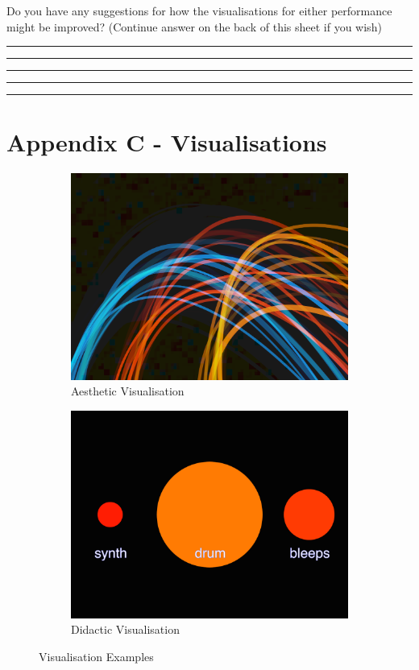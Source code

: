 \documentclass[12pt]{article}
\begin{document}
Do you have any suggestions for how the visualisations for either performance might be improved? (Continue answer on the back of this sheet if you wish)\\

\hrule \bigskip \hrule \bigskip \hrule \bigskip \hrule \bigskip \hrule \bigskip

\newpage
\section*{Appendix C - Visualisations}

\begin{figure}[H]
\centering
\begin{subfigure}{.5\textwidth}
    \centering
    \includegraphics[width=0.9\linewidth]{visualisations/aesthetic-vis.png}
    \caption{Aesthetic Visualisation}
    \label{avis}
\end{subfigure}%
\begin{subfigure}{.5\textwidth}
    \centering
    \includegraphics[width=0.9\linewidth]{visualisations/didactic-vis.png}
    \caption{Didactic Visualisation}
    \label{dvis}
\end{subfigure}
\caption{Visualisation Examples}
\end{figure}
\end{document}
